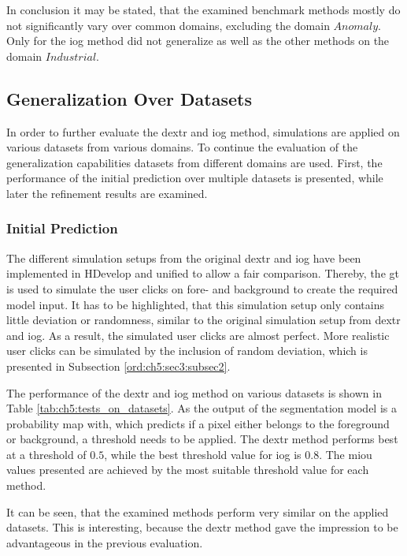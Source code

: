 In conclusion it may be stated, that the examined benchmark methods mostly do not significantly vary over common domains, excluding the domain $ Anomaly $.
Only for the \gls{iog} method did not generalize as well as the other methods on the domain $ Industrial $.


\subsection{Generalization Over Datasets} \label{ord:ch5:sec2:subsec2}

In order to further evaluate the \gls{dextr} and \gls{iog} method, simulations are applied on various datasets from various domains.
To continue the evaluation of the generalization capabilities datasets from different domains are used.
First, the performance of the initial prediction over multiple datasets is presented, while later the refinement results are examined. 

\subsubsection{Initial Prediction}

The different simulation setups from the original \gls{dextr} \cite{Man18-DEXTR} and \gls{iog} \cite{Zha20-IOG} have been implemented in HDevelop and unified to allow a fair comparison. 
Thereby, the \gls{gt} is used to simulate the user clicks on fore- and background to create the required model input.
It has to be highlighted, that this simulation setup only contains little deviation or randomness, similar to the original simulation setup from \gls{dextr} and \gls{iog}.
As a result, the simulated user clicks are almost perfect.
More realistic user clicks can be simulated by the inclusion of random deviation, which is presented in Subsection \ref{ord:ch5:sec3:subsec2}.

The performance of the \gls{dextr} and \gls{iog} method on various datasets is shown in Table \ref{tab:ch5:tests_on_datasets}.
As the output of the segmentation model is a probability map with, which predicts if a pixel either belongs to the foreground or background, a threshold needs to be applied.
The \gls{dextr} method performs best at a threshold of $ 0.5 $, while the best threshold value for \gls{iog} is $ 0.8 $.
The \gls{miou} values presented are achieved by the most suitable threshold value for each method.

It can be seen, that the examined methods perform very similar on the applied datasets.
This is interesting, because the \gls{dextr} method gave the impression to be advantageous in the previous evaluation.


